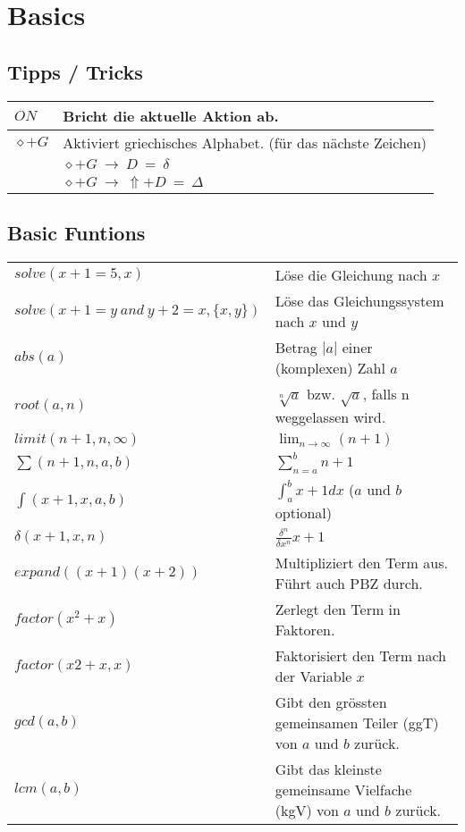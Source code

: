 \section{Basics}

\subsection{Tipps / Tricks}
\begin{tabular}{|l|l|}
	\hline
	$ON$			& Bricht die aktuelle Aktion ab. \\ \hline
	$\diamond + G$	& Aktiviert griechisches Alphabet. (für das nächste Zeichen) \\
					& $\diamond+G \: \to \: D \: = \: \delta$ \\
					& $\diamond+G \: \to \: \Uparrow+D \: = \: \Delta$ \\ \hline
\end{tabular}

\subsection{Basic Funtions}
\begin{tabular}{|l|l|}
	\hline
	$solve(x+1=5,x)$									& Löse die Gleichung nach $x$											\\
	$solve(x+1=y \: and \: y+2=x,\{x,y\})$				& Löse das Gleichungssystem nach $x$ und $y$							\\ \hline
	$abs(a)$ 											& Betrag  $|a|$ einer (komplexen) Zahl $a$								\\ \hline
	$root(a,n)$											& $\sqrt[n]{a}$ bzw. $\sqrt{a}$, falls n weggelassen wird.				\\ \hline
	$limit(n+1,n,\infty)$								& $\lim_{n \to \infty}(n+1)$											\\ \hline
	$\sum(n+1,n,a,b)$									& $\sum_{n=a}^b n+1$													\\ \hline
	$\int(x+1,x,a,b)$									& $\int_{a}^b x+1 dx$ ($a$ und $b$ optional)							\\ \hline
	$\delta(x+1,x,n)$									& $\frac{\delta^n}{\delta x^n} x+1$										\\ \hline
	$expand((x+1)(x+2))$								& Multipliziert den Term aus. Führt auch PBZ durch.						\\ \hline
	$factor(x^2+x)$										& Zerlegt den Term in Faktoren.											\\ 
	$factor(x2 +x,x)$									& Faktorisiert den Term nach der Variable $x$							\\ \hline
	$gcd(a,b)$											& Gibt den grössten gemeinsamen Teiler (ggT) von $a$ und $b$ zurück.	\\ \hline
	$lcm(a,b)$											& Gibt das kleinste gemeinsame Vielfache (kgV) von $a$ und $b$ zurück.	\\ \hline
\end{tabular}

